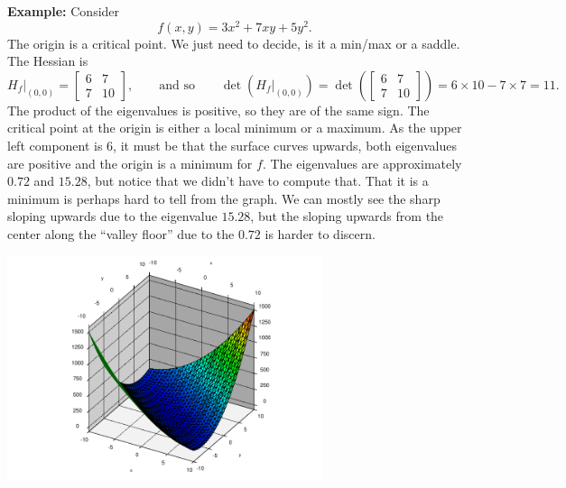 \documentclass[12pt]{article}
\begin{document}
\pagebreak[2]
\textbf{Example:}  Consider
\[
f(x,y) = 3 x^2 + 7xy  + 5y^2 .
\]
The origin is a critical point.
We just need to decide, is it a min/max or a
saddle.
The Hessian is
\[
H_f \big|_{(0,0)} =
\begin{bmatrix}
6 & 7 \\
7 & 10
\end{bmatrix}
,
\qquad
\text{and so}
\qquad
\det(H_f\big|_{(0,0)}) = 
\det \left(
\begin{bmatrix}
6 & 7 \\
7 & 10
\end{bmatrix}
\right)
=
6 \times 10 - 7 \times 7 = 11 .
\]
The product of the eigenvalues is positive, so they are of the same sign.
The critical point at the origin is either a local minimum or a maximum.
As the upper left component is 6, it must be that the surface curves
upwards, both eigenvalues are positive and the origin is a minimum for $f$.
The eigenvalues are approximately $0.72$ and $15.28$, but notice
that we didn't have to compute that.  That it is a minimum is perhaps
hard to tell from the graph.  We can mostly see the sharp sloping upwards
due to the eigenvalue $15.28$, but the sloping upwards from the center along
the ``valley floor'' due to the $0.72$ is harder to discern.
\nopagebreak
\begin{center}
\includegraphics[width=3.65in]{all-upwards.pdf}
\end{center}

\bigskip
\end{document}
